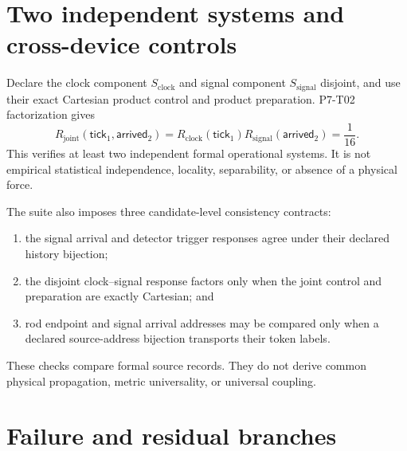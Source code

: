 \documentclass[11pt]{article}
\begin{document}
\section{Two independent systems and cross-device controls}

Declare the clock component \(S_{\mathrm{clock}}\) and signal component
\(S_{\mathrm{signal}}\) disjoint, and use their exact Cartesian product
control and product preparation. P7-T02 factorization gives
\[
  R_{\mathrm{joint}}
  (\mathsf{tick}_1,\mathsf{arrived}_2)
  =
  R_{\mathrm{clock}}(\mathsf{tick}_1)
  R_{\mathrm{signal}}(\mathsf{arrived}_2)
  =
  \frac1{16}.
\]
This verifies at least two independent formal operational systems. It is not
empirical statistical independence, locality, separability, or absence of a
physical force.

The suite also imposes three candidate-level consistency contracts:
\begin{enumerate}[leftmargin=*]
\item the signal arrival and detector trigger responses agree under their
  declared history bijection;
\item the disjoint clock--signal response factors only when the joint control
  and preparation are exactly Cartesian; and
\item rod endpoint and signal arrival addresses may be compared only when a
  declared source-address bijection transports their token labels.
\end{enumerate}
These checks compare formal source records. They do not derive common
physical propagation, metric universality, or universal coupling.

\section{Failure and residual branches}
\end{document}
